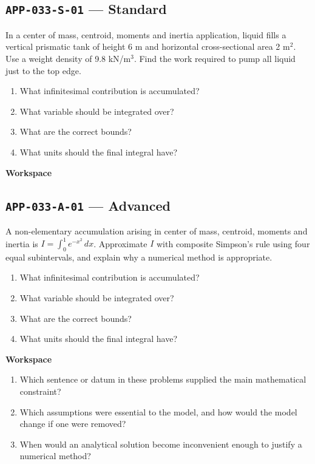\documentclass[11pt]{book}
\newcommand{\pid}[1]{\texttt{#1}}
\newcommand{\workspace}{\par\vspace{0.7in}\hrulefill\par\vspace{0.55in}\hrulefill\par}
\begin{document}
\subsection*{\pid{APP-033-S-01} — Standard}
\begin{problembox}
In a center of mass, centroid, moments and inertia application, liquid fills a vertical prismatic tank of height 6 m and horizontal cross-sectional area 2 m$^2$. Use a weight density of 9.8 kN/m$^3$. Find the work required to pump all liquid just to the top edge.
\end{problembox}
\begin{promptbox}\begin{enumerate}
\item What infinitesimal contribution is accumulated?
\item What variable should be integrated over?
\item What are the correct bounds?
\item What units should the final integral have?
\end{enumerate}\end{promptbox}
\textbf{Workspace}\workspace
{}
\subsection*{\pid{APP-033-A-01} — Advanced}
\begin{problembox}
A non-elementary accumulation arising in center of mass, centroid, moments and inertia is $I=\int_0^1 e^{-x^2}\,dx$. Approximate $I$ with composite Simpson's rule using four equal subintervals, and explain why a numerical method is appropriate.
\end{problembox}
\begin{promptbox}\begin{enumerate}
\item What infinitesimal contribution is accumulated?
\item What variable should be integrated over?
\item What are the correct bounds?
\item What units should the final integral have?
\end{enumerate}\end{promptbox}
\textbf{Workspace}\workspace
\begin{reflectionbox}\begin{enumerate}
\item Which sentence or datum in these problems supplied the main mathematical constraint?
\item Which assumptions were essential to the model, and how would the model change if one were removed?
\item When would an analytical solution become inconvenient enough to justify a numerical method?
\end{enumerate}\end{reflectionbox}
\end{document}
